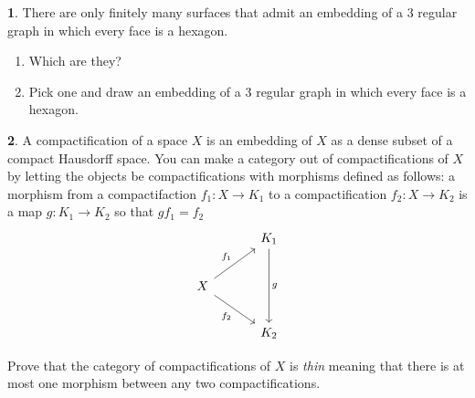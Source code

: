 \documentclass[11pt]{article}
\theoremstyle{definition}
\newtheorem{problem}{}
\newcommand{\bp}{\begin{problem}}
\newcommand{\ep}{\end{problem}\bigskip}
\theoremstyle{theorem}
\begin{document}
\bp There are only finitely many surfaces that admit an embedding of a $3$ regular graph in which every face is a hexagon. 
\begin{enumerate}[label=(\alph*)]
  \item Which are they?
  \item Pick one and draw an embedding of a $3$ regular graph in which every face is a hexagon.
\end{enumerate}
\ep

\bp A compactification of a space $X$ is an embedding of $X$ as a dense subset of a compact Hausdorff space.  You can make a category out of compactifications of $X$ by letting the objects be compactifications with morphisms defined as follows:  a morphism from a compactifaction $f_1:X \to K_1$ to a compactification $f_2:X \to K_2$ is a map $g:K_1 \to K_2$ so that $gf_1=f_2$
\[
\begin{tikzcd}[row sep=2.2em, column sep=3.2em]
 & K_1 \arrow[dd,"g"] \\
 X \arrow[ur,"f_1"] \arrow[dr,swap,"f_2"] \\
& K_2
\end{tikzcd}
\]

Prove that the category of compactifications of $X$ is \emph{thin} meaning that there is at most one morphism between any two compactifications.
\ep

\end{document}

